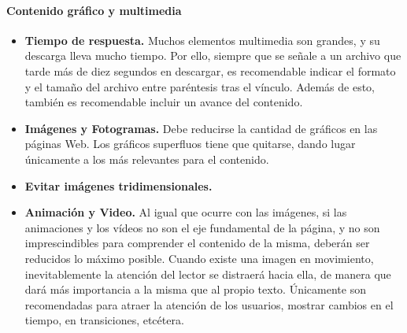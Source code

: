 	
		\paragraph{Contenido gráfico y multimedia} %
		\label{par:cont_contenido_grafico_y_multimedia}
			\begin{itemize}
				\item \textbf{Tiempo de respuesta.} Muchos elementos multimedia son grandes, y su descarga lleva mucho tiempo. Por ello, siempre que se señale a un archivo que tarde más de diez segundos en descargar, es recomendable indicar el formato y el tamaño del archivo entre paréntesis tras el vínculo. Además de esto, también es recomendable incluir un avance del contenido.
				\item \textbf{Imágenes y Fotogramas.} 	Debe reducirse la cantidad de gráficos en las páginas Web. Los gráficos superfluos tiene que quitarse, dando lugar únicamente a los más relevantes para el contenido. 
				\item \textbf{Evitar imágenes tridimensionales.}
				\item \textbf{Animación y Video.} Al igual que ocurre con las imágenes, si las animaciones y los vídeos no son el eje fundamental de la página, y no son imprescindibles para comprender el contenido de la misma, deberán ser reducidos lo máximo posible. Cuando existe una imagen en movimiento, inevitablemente la atención del lector se distraerá hacia ella, de manera que dará más importancia a la misma que al propio texto. Únicamente son recomendadas para atraer la atención de los usuarios, mostrar cambios en el tiempo, en transiciones, etcétera.
			\end{itemize}

				
	
	
	
	
